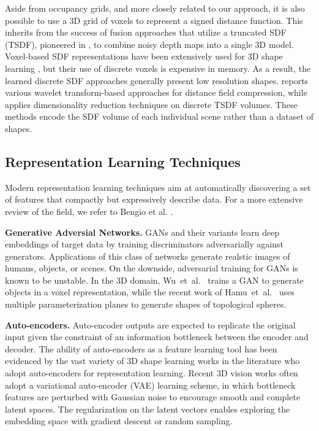 \documentclass[10pt,twocolumn,letterpaper]{article}
\begin{document}
Aside from occupancy grids, and more closely related to our approach, it is also possible to use a 3D grid of voxels to represent a signed distance function.  This inherits from the success of fusion approaches that utilize a truncated SDF (TSDF), pioneered in \cite{curless1996volumetric, newcombe2011kinectfusion}, to combine noisy depth maps into a single 3D model.  Voxel-based SDF representations have been extensively used for 3D shape learning \cite{zeng20173dmatch,dai2017shape, stutz2018learning}, but their use of discrete voxels is expensive in memory. As a result, the learned discrete SDF approaches generally present low resolution shapes. \cite{Distance_Field_Compression} reports various wavelet transform-based approaches for distance field compression, while \cite{canelhas2016eigenshapes} applies dimensionality reduction techniques on discrete TSDF volumes. These methods encode the SDF volume of each individual scene rather than a dataset of shapes.


\subsection{Representation Learning Techniques}\label{related-generative}
Modern representation learning techniques aim at automatically discovering a set of features that compactly but expressively describe data. For a more extensive review of the field, we refer to Bengio et al. \cite{bengio2013representation}. 


\noindent\textbf{Generative Adversial Networks.} GANs \cite{goodfellow2014generative} and their variants \cite{chen2016infogan,radford2015unsupervised} learn deep embeddings of target data by training discriminators adversarially against generators. Applications of this class of networks \cite{isola2017image,karras2017progressive} generate realstic images of humans, objects, or scenes. On the downside, adversarial training for GANs is known to be unstable.
%
In the 3D domain, Wu~et~al.~\cite{wu2016learning} trains a GAN to generate objects in a voxel representation, while the recent work of Hamu~et~al.~\cite{hamu2018multi} uses multiple parameterization planes to generate shapes of topological spheres.

\noindent\textbf{Auto-encoders.}
Auto-encoder outputs are expected to replicate the original input given the constraint of an information bottleneck between the encoder and decoder. The ability of auto-encoders as a feature learning tool has been evidenced by the vast variety of 3D shape learning works in the literature \cite{dai2017shape, stutz2018learning,bagautdinov2018modeling,groueix2018atlasnet,wu2018learning} who adopt auto-encoders for representation learning. Recent 3D vision works \cite{bloesch2018codeslam, bagautdinov2018modeling, litany2017deformable} often adopt a variational auto-encoder (VAE) learning scheme, in which bottleneck features are perturbed with Gaussian noise to encourage smooth and complete latent spaces. The regularization on the latent vectors enables exploring the embedding space with gradient descent or random sampling.
\end{document}
